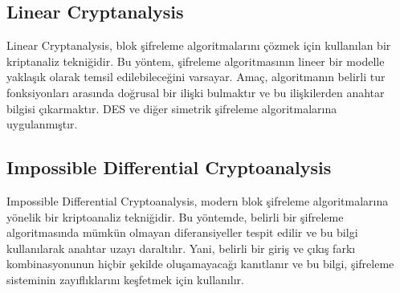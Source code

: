 \newpage

\subsection{Linear Cryptanalysis}

Linear Cryptanalysis, blok şifreleme algoritmalarını çözmek için kullanılan bir kriptanaliz tekniğidir. Bu yöntem, şifreleme algoritmasının lineer bir modelle yaklaşık olarak temsil edilebileceğini varsayar. Amaç, algoritmanın belirli tur fonksiyonları arasında doğrusal bir ilişki bulmaktır ve bu ilişkilerden anahtar bilgisi çıkarmaktır. DES ve diğer simetrik şifreleme algoritmalarına uygulanmıştır.

\newpage

\subsection{Impossible Differential Cryptoanalysis}

Impossible Differential Cryptoanalysis, modern blok şifreleme algoritmalarına yönelik bir kriptoanaliz tekniğidir. Bu yöntemde, belirli bir şifreleme algoritmasında mümkün olmayan diferansiyeller tespit edilir ve bu bilgi kullanılarak anahtar uzayı daraltılır. Yani, belirli bir giriş ve çıkış farkı kombinasyonunun hiçbir şekilde oluşamayacağı kanıtlanır ve bu bilgi, şifreleme sisteminin zayıflıklarını keşfetmek için kullanılır.

\newpage